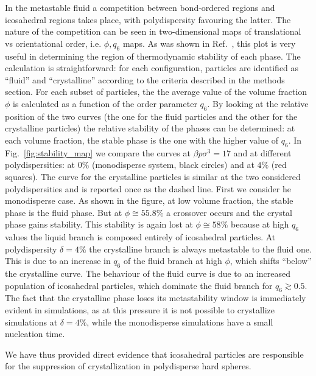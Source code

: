 \documentclass[twocolumn,superscriptaddress]{revtex4-1}
\begin{document}
In the metastable fluid a competition between bond-ordered regions and icosahedral regions takes
place, with polydispersity favouring the latter. The nature of the competition can be seen
in two-dimensional maps of translational vs orientational order, i.e. $\phi,q_6$ maps.
As was shown in Ref.~\cite{russo_hs}, this plot is very useful in determining the region
of thermodynamic stability of each phase. The calculation is straightforward: for each
configuration, particles are identified as ``fluid'' and ``crystalline'' according to
the criteria described in the methods section. For each subset of particles, the
the average value of the volume fraction
$\phi$ is calculated as a function of the order parameter $q_6$. By looking at the
relative position of the two curves (the one for the fluid particles and the other for the crystalline particles)
the relative stability of the phases can be determined: at each volume fraction,
the stable phase is the one with the higher value of $q_6$. In Fig.~\ref{fig:stability_map}
we compare the curves at $\beta p\sigma^3=17$ and at different polydispersities:
at $0\%$ (monodisperse system, black circles) and at $4\%$ (red squares). The curve for the
crystalline particles is similar at the two considered polydispersities and is reported once
as the dashed line. First we consider he monodisperse case. As shown in the figure,
at low volume fraction, the stable phase is the fluid phase. But at $\phi\cong 55.8\%$ a crossover
occurs and the crystal phase gains stability. This stability is again lost at $\phi\cong 58\%$
because at high $q_6$ values the liquid branch is composed entirely of icosahedral particles.
At polydispersity $\delta=4\%$ the crystalline branch is always metastable to the fluid one.
This is due to an increase in $q_6$ of the fluid branch at high $\phi$, which shifts ``below'' the
crystalline curve. The behaviour of the fluid curve is due to an increased population of
icosahedral particles, which dominate the fluid branch for $q_6\gtrsim 0.5$. The fact that
the crystalline phase loses its metastability window is immediately evident in simulations,
as at this pressure it is not possible to crystallize simulations at $\delta=4\%$, while the
monodisperse simulations have a small nucleation time.

We have thus provided direct evidence that icosahedral particles are responsible for the suppression
of crystallization in polydisperse hard spheres.
\end{document}

